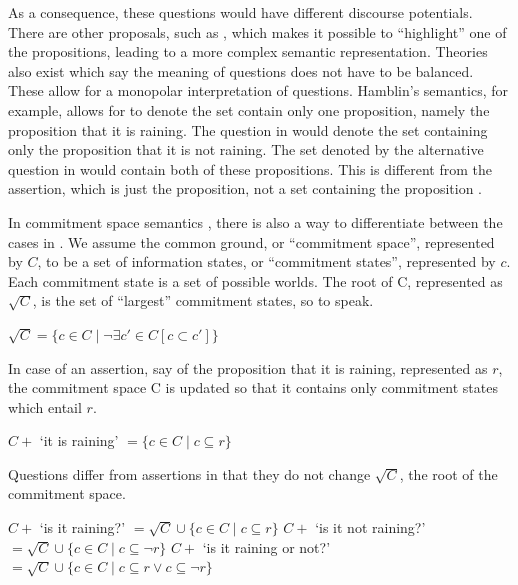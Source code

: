 \documentclass[output=paper,colorlinks,citecolor=brown]{langscibook}
\begin{document}
As a consequence, these questions would have different discourse potentials. There are other proposals, such as  \citet{roelofsengool2010disjunctive}, which makes it possible to ``highlight'' one of the propositions, leading to a more complex semantic representation. Theories also exist which say the meaning of questions does not have to be balanced. These allow for a monopolar interpretation of questions. Hamblin's semantics, for example, allows for  to denote the set contain only one proposition, namely the proposition that it is raining. The question in   would denote the set containing only the proposition that it is not raining. The set denoted by the alternative question in  would contain both of these propositions. This is different from the assertion, which is just the proposition, not a set containing the proposition \citep{vanrooysafarova2003polar}.

In commitment space semantics \citep{krifka2015bias}, there is also a way to differentiate between the cases in . We assume the common ground, or ``commitment space'', represented by $C$, to be a set of information states, or ``commitment states'', represented by $c$. Each commitment state is a set of possible worlds. The root of C, represented as $\sqrt{C}$, is the set of ``largest'' commitment states, so to speak. %

\ea\label{rootC}
$\sqrt{C} = \{c \in C \mid \neg\exists c' \in C [c \subset c']\}$
\z

In case of an assertion, say of the proposition that it is raining, represented as $r$, the commitment space C is updated so that it contains only commitment states which entail $r$. 

\ea\label{assertioncommitment}
$C +$ `it is raining' $= \{c \in C \mid c \subseteq r\}$
\z

Questions differ from assertions in that they do not change $\sqrt{C}$, the root of the commitment space. 

\ea\label{questioncommitment}
\ea\label{positivequestioncommitment}
$C +$ `is it raining?' $= \sqrt{C} \cup \{c \in C \mid c \subseteq r\}$
\ex\label{negativequestioncommitment}
$C +$ `is it not raining?' $= \sqrt{C} \cup \{c \in C \mid c \subseteq \neg r\}$
\ex\label{alternativequestioncommitment}
$C +$ `is it raining or not?' $= \sqrt{C} \cup \{c \in C \mid c \subseteq r \vee c \subseteq \neg r\}$
\z
\z
\end{document}

